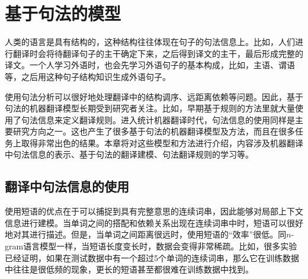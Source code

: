 
%


\renewcommand\figurename{图}%
\renewcommand\tablename{表}%


\chapter{基于句法的模型}

人类的语言是具有结构的，这种结构往往体现在句子的句法信息上。比如，人们进行翻译时会将待翻译句子的主干确定下来，之后得到译文的主干，最后形成完整的译文。一个人学习外语时，也会先学习外语句子的基本构成，比如，主语、谓语等，之后用这种句子结构知识生成外语句子。

使用句法分析可以很好地处理翻译中的结构调序、远距离依赖等问题。因此，基于句法的机器翻译模型长期受到研究者关注。比如，早期基于规则的方法里就大量使用了句法信息来定义翻译规则。进入统计机器翻译时代，句法信息的使用同样是主要研究方向之一。这也产生了很多基于句法的机器翻译模型及方法，而且在很多任务上取得非常出色的结果。本章将对这些模型和方法进行介绍，内容涉及机器翻译中句法信息的表示、基于句法的翻译建模、句法翻译规则的学习等。


\section{翻译中句法信息的使用}

\parinterval 使用短语的优点在于可以捕捉到具有完整意思的连续词串，因此能够对局部上下文信息进行建模。当单词之间的搭配和依赖关系出现在连续词串中时，短语可以很好地对其进行描述。但是，当单词之间距离很远时，使用短语的“效率”很低。同$n$-gram语言模型一样，当短语长度变长时，数据会变得非常稀疏。比如，很多实验已经证明，如果在测试数据中有一个超过5个单词的连续词串，那么它在训练数据中往往是很低频的现象，更长的短语甚至都很难在训练数据中找到。

